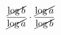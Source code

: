 \documentclass{article}
\begin{document}
$
\displaystyle\frac{\cancel{\log{b}}}{\cancel{\log{a}}} \cdot 
\displaystyle\frac{\cancel{\log{a}}}{\cancel{\log{b}}}
$
\end{document}
